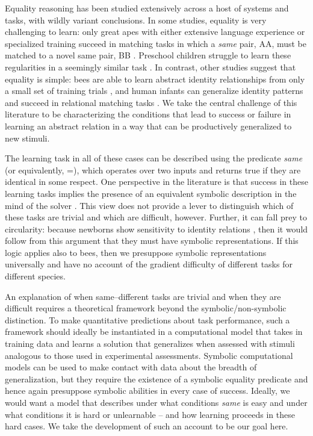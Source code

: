 \documentclass{article}
\renewcommand{\cite}{\citep}
\begin{document}
Equality reasoning has been studied extensively across a host of systems and tasks, with wildly variant conclusions. In some studies, equality is very challenging to learn: only great apes with either extensive language experience or specialized training succeed in matching tasks in which a \emph{same} pair, AA, must be matched to a novel same pair, BB \cite{Premack:1983,thompson:2001}. Preschool children struggle to learn these regularities in a seemingly similar task \citep{walker:2016}. In contrast, other studies suggest that equality is simple: bees are able to learn abstract identity relationships from only a small set of training trials \cite{giurfa:2001,avargues:2011}, and human infants can generalize identity patterns \cite{anderson:2018} and succeed in relational matching tasks \cite{ferry:2015}. We take the central challenge of this literature to be characterizing the conditions that lead to success or failure in learning an abstract relation in a way that can be productively generalized to new stimuli.

The learning task in all of these cases can be described using the predicate \emph{same} (or equivalently, =), which operates over two inputs and returns {\sc true} if they are identical in some respect. One perspective in the literature is that success in these learning tasks implies the presence of an equivalent symbolic description in the mind of the solver \cite{marcus:1999,Premack:1983}. This view does not provide a lever to distinguish which of these tasks are trivial and which are difficult, however. Further, it can fall prey to circularity: because newborns show sensitivity to identity relations \cite{gervain:2012}, then it would follow from this argument that they must have symbolic representations. If this logic applies also to bees, then we presuppose symbolic representations universally and have no account of the gradient difficulty of different tasks for different species.

An explanation of when same--different tasks are trivial and when they are difficult requires a theoretical framework beyond the symbolic/non-symbolic distinction. To make quantitative predictions about task performance, such a framework should ideally be instantiated in a computational model that takes in training data and learns a solution that generalizes when assessed with stimuli analogous to those used in experimental assessments. Symbolic computational models \cite[e.g.,][]{frank:2011} can be used to make contact with data about the breadth of generalization, but they require the existence of a symbolic equality predicate and hence again presuppose symbolic abilities in every case of success. Ideally, we would want a model that describes under what conditions \emph{same} is easy and under what conditions it is hard or unlearnable -- and how learning proceeds in these hard cases. We take the development of such an account to be our goal here.
\end{document}
